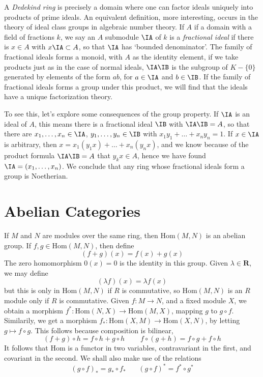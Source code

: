 A \emph{Dedekind ring} is precisely a domain where one can factor ideals uniquely into products of prime ideals. An equivalent definition, more interesting, occurs in the theory of ideal class groups in algebraic number theory. If $A$ if a domain with a field of fractions $k$, we say an $A$ submodule $\IA$ of $k$ is a \emph{fractional ideal} if there is $x \in A$ with $x \IA \subset A$, so that $\IA$ has `bounded denominator'. The family of fractional ideals forms a monoid, with $A$ as the identity element, if we take products just as in the case of normal ideals, $\IA \IB$ is the subgroup of $K - \{ 0 \}$ generated by elements of the form $ab$, for $a \in \IA$ and $b \in \IB$. If the family of fractional ideals forms a group under this product, we will find that the ideals have a unique factorization theory.

To see this, let's explore some consequences of the group property. If $\IA$ is an ideal of $A$, this means there is a fractional ideal $\IB$ with $\IA \IB = A$, so that there are $x_1, \dots, x_n \in \IA$, $y_1, \dots, y_n \in \IB$ with $x_1y_1 + \dots + x_ny_n = 1$. If $x \in \IA$ is arbitrary, then $x = x_1 (y_1 x) + \dots + x_n (y_n x)$, and we know because of the product formula $\IA \IB = A$ that $y_k x \in A$, hence we have found $\IA = (x_1, \dots, x_n)$. We conclude that any ring whose fractional ideals form a group is Noetherian.

\section{Abelian Categories}

If $M$ and $N$ are modules over the same ring, then $\text{Hom}(M,N)$ is an abelian group. If $f,g \in \text{Hom}(M,N)$, then define
%
\[ (f + g)(x) = f(x) + g(x) \]
%
The zero homomorphism $0(x) = 0$ is the identity in this group. Given $\lambda \in \mathbf{R}$, we may define
%
\[ (\lambda f)(x) = \lambda f(x) \]
%
but this is only in $\text{Hom}(M,N)$ if $R$ is commutative, so $\text{Hom}(M,N)$ is an $R$ module only if $R$ is commutative. Given $f: M \to N$, and a fixed module $X$, we obtain a morphism $f^*: \text{Hom}(N,X) \to \text{Hom}(M,X)$, mapping $g$ to $g \circ f$. Similarily, we get a morphism $f_*: \text{Hom}(X,M) \to \text{Hom}(X,N)$, by letting $g \mapsto f \circ g$. This follows because composition is bilinear,
%
\[ (f + g) \circ h = f \circ h + g \circ h\ \ \ \ \ \ \ \ \ \ f \circ (g + h) = f \circ g + f \circ h \]
It follows that $\text{Hom}$ is a functor in two variables, contravariant in the first, and covariant in the second. We shall also make use of the relations
%
\[ (g \circ f)_* = g_* \circ f_*\ \ \ \ \ \ \ \ (g \circ f)^* = f^* \circ g^* \]

